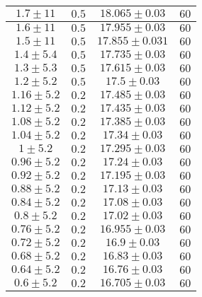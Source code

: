 \documentclass[@MAIN@]{subfile}
\begin{document}
\begin{tabular}{ ||c|c|c|c|| }
        \hline
        $1.7\pm 11$       & $0.5$       & $18.065\pm 0.03$  & $60$     \\
        \hline
        $1.6\pm 11$       & $0.5$       & $17.955\pm 0.03$  & $60$     \\
        \hline
        $1.5\pm 11$       & $0.5$       & $17.855\pm 0.031$ & $60$     \\
        \hline
        $1.4\pm 5.4$      & $0.5$       & $17.735\pm 0.03$  & $60$     \\
        \hline
        $1.3\pm 5.3$      & $0.5$       & $17.615\pm 0.03$  & $60$     \\
        \hline
        $1.2\pm 5.2$      & $0.5$       & $17.5\pm 0.03$    & $60$     \\
        \hline
        $1.16\pm 5.2$     & $0.2$       & $17.485\pm 0.03$  & $60$     \\
        \hline
        $1.12\pm 5.2$     & $0.2$       & $17.435\pm 0.03$  & $60$     \\
        \hline
        $1.08\pm 5.2$     & $0.2$       & $17.385\pm 0.03$  & $60$     \\
        \hline
        $1.04\pm 5.2$     & $0.2$       & $17.34\pm 0.03$   & $60$     \\
        \hline
        $1\pm 5.2$        & $0.2$       & $17.295\pm 0.03$  & $60$     \\
        \hline
        $0.96\pm 5.2$     & $0.2$       & $17.24\pm 0.03$   & $60$     \\
        \hline
        $0.92\pm 5.2$     & $0.2$       & $17.195\pm 0.03$  & $60$     \\
        \hline
        $0.88\pm 5.2$     & $0.2$       & $17.13\pm 0.03$   & $60$     \\
        \hline
        $0.84\pm 5.2$     & $0.2$       & $17.08\pm 0.03$   & $60$     \\
        \hline
        $0.8\pm 5.2$      & $0.2$       & $17.02\pm 0.03$   & $60$     \\
        \hline
        $0.76\pm 5.2$     & $0.2$       & $16.955\pm 0.03$  & $60$     \\
        \hline
        $0.72\pm 5.2$     & $0.2$       & $16.9\pm 0.03$    & $60$     \\
        \hline
        $0.68\pm 5.2$     & $0.2$       & $16.83\pm 0.03$   & $60$     \\
        \hline
        $0.64\pm 5.2$     & $0.2$       & $16.76\pm 0.03$   & $60$     \\
        \hline
        $0.6\pm 5.2$      & $0.2$       & $16.705\pm 0.03$  & $60$     \\

\end{tabular}
\end{document}
